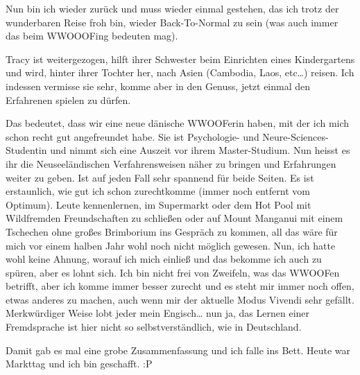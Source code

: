 Nun bin ich wieder zurück und muss wieder einmal gestehen, das ich trotz
der wunderbaren Reise froh bin, wieder Back-To-Normal zu sein (was auch
immer das beim WWOOOFing bedeuten mag).

Tracy ist weitergezogen, hilft ihrer Schwester beim Einrichten eines
Kindergartens und wird, hinter ihrer Tochter her, nach Asien (Cambodia,
Laos, etc\ldots) reisen. Ich indessen vermisse sie sehr, komme aber in
den Genuss, jetzt einmal den Erfahrenen spielen zu dürfen.

Das bedeutet, dass wir eine neue dänische WWOOFerin haben, mit der ich
mich schon recht gut angefreundet habe. Sie ist Psychologie- und
Neure-Sciences-Studentin und nimmt sich eine Auszeit vor ihrem
Master-Studium. Nun heisst es ihr die Neuseeländischen Verfahrensweisen
näher zu bringen und Erfahrungen weiter zu geben. Ist auf jeden Fall
sehr spannend für beide Seiten. Es ist erstaunlich, wie gut ich schon
zurechtkomme (immer noch entfernt vom Optimum). Leute kennenlernen, im
Supermarkt oder dem Hot Pool mit Wildfremden Freundschaften zu schließen
oder auf Mount Manganui mit einem Tschechen ohne großes Brimborium ins
Gespräch zu kommen, all das wäre für mich vor einem halben Jahr wohl
noch nicht möglich gewesen. Nun, ich hatte wohl keine Ahnung, worauf ich
mich einließ und das bekomme ich auch zu spüren, aber es lohnt sich. Ich
bin nicht frei von Zweifeln, was das WWOOFen betrifft, aber ich komme
immer besser zurecht und es steht mir immer noch offen, etwas anderes zu
machen, auch wenn mir der aktuelle Modus Vivendi sehr gefällt.
Merkwürdiger Weise lobt jeder mein Engisch\ldots{} nun ja, das Lernen
einer Fremdsprache ist hier nicht so selbstverständlich, wie in
Deutschland.

Damit gab es mal eine grobe Zusammenfassung und ich falle ins Bett.
Heute war Markttag und ich bin geschafft. :P
